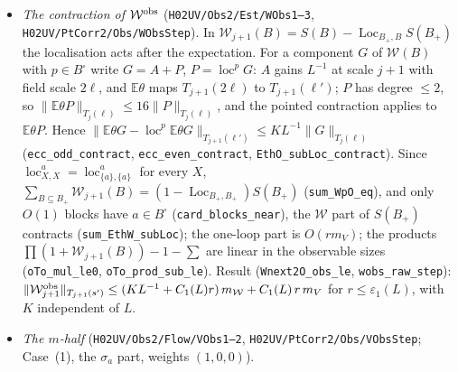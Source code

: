 \documentclass[11pt]{amsart}
\theoremstyle{definition}
\theoremstyle{remark}
\numberwithin{equation}{section}
\newcommand{\E}{\mathbb{E}}
\newcommand{\Loc}{\operatorname{Loc}}
\begin{document}
\begin{itemize}
  $\theta_0=C_0(L^{-1}+(A/2)^{-\eta})$, $B=\theta_0c_b+C_1(8+2c_b+c_b^2)$ (\texttt{kobs\_raw\_step}; the factor $8\ge e^{4\delta}$ and
  the regulator $A/2$ come from $K^\flat=\prod e^{\Delta(B)}K$, \texttt{oTo\_KflatO\_le}). Along a regular history, with
  $r_j=c_Rg_j$, $c_b=8c_x$, $c_k=64B$ and $\bar\theta=\theta_0+C_1(2+2c_b+c_k)c_R\varepsilon$:
  if $\theta_0\le1/72$, $C_1(2+2c_b+c_k)c_R\varepsilon\le1/72$, $\varepsilon$ is small, $m_j\le2m_{j+1}$ and $K^{\rm obs}_0=0$, then
  \[A^{(|\mathcal B_j(X)|-4)_+}\|K^{\rm obs}_j(X)\|_{T_j(s_j)}\le k_j:=\sum_{i<j}(8\bar\theta)^{j-1-i}B\,r_i^2m_i,\qquad 8k_j\le c_kr_j^2m_j\]
  (\texttt{kobs\_hist}, \texttt{kseq\_eq\_sum}), and the activity term of the $\mu$ flow is bounded by
  $c\,(8k_j/w_a)s_j^{-1}$ (\texttt{kobs\_EK}). The observable sizes $m_j$ (with $\|\mathcal W^{\rm obs}_j\|\le r_jm_j$) are inputs.
\item \emph{The contraction of $\mathcal W^{\rm obs}$} (\texttt{H02UV/Obs2/Est/WObs1--3}, \texttt{H02UV/PtCorr2/Obs/WObsStep}). In
  $\mathcal W_{j+1}(B)=S(B)-\Loc_{B_+,B}S(B_+)$ the localisation acts after the expectation. For a component $G$ of
  $\mathcal W(B)$ with $p\in B^\square$ write $G=A+P$, $P=\operatorname{loc}^pG$: $A$ gains $L^{-1}$ at scale $j+1$ with field
  scale $2\ell$, and $\E\theta$ maps $T_{j+1}(2\ell)$ to $T_{j+1}(\ell')$; $P$ has degree $\le2$, so
  $\|\E\theta P\|_{T_j(\ell)}\le16\|P\|_{T_j(\ell)}$, and the pointed contraction applies to $\E\theta P$. Hence
  $\|\E\theta G-\operatorname{loc}^p\E\theta G\|_{T_{j+1}(\ell')}\le KL^{-1}\|G\|_{T_j(\ell)}$ (\texttt{ecc\_odd\_contract},
  \texttt{ecc\_even\_contract}, \texttt{EthO\_subLoc\_contract}). Since $\operatorname{loc}^a_{X,X}=\operatorname{loc}^a_{\{a\},\{a\}}$
  for every $X$, $\sum_{B\subseteq B_+}\mathcal W_{j+1}(B)=(1-\Loc_{B_+,B_+})S(B_+)$ (\texttt{sum\_WpO\_eq}), and only $O(1)$
  blocks have $a\in B^\square$ (\texttt{card\_blocks\_near}), the $\mathcal W$ part of $S(B_+)$ contracts
  (\texttt{sum\_EthW\_subLoc}); the one-loop part is $O(rm_V)$; the products $\prod(1+\mathcal W_{j+1}(B))-1-\sum$ are linear
  in the observable sizes (\texttt{oTo\_mul\_le0}, \texttt{oTo\_prod\_sub\_le}). Result (\texttt{Wnext2O\_obs\_le},
  \texttt{wobs\_raw\_step}): $\|\mathcal W^{\rm obs}_{j+1}\|_{T_{j+1}(s')}\le(KL^{-1}+C_1(L)r)\,m_{\mathcal W}+C_1(L)\,r\,m_V$ for
  $r\le\varepsilon_1(L)$, with $K$ independent of $L$.
\item \emph{The $m$-half} (\texttt{H02UV/Obs2/Flow/VObs1--2}, \texttt{H02UV/PtCorr2/Obs/VObsStep}; Case~(1), the $\sigma_a$ part, weights $(1,0,0)$).

\end{itemize}
\end{document}
